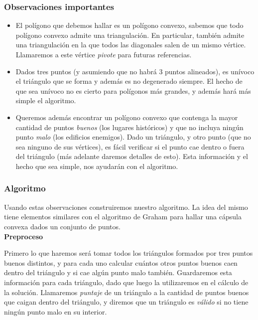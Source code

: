 \subsubsection{Observaciones importantes}
\begin{itemize}
\item El polígono que debemos hallar es un polígono convexo, sabemos que todo 
polígono convexo admite una triangulación. En particular, también admite una triangulación 
en la que todos las diagonales salen de un mismo vértice. Llamaremos a este vértice \textit{pivote} 
para futuras referencias. 
\item Dados tres puntos (y asumiendo que no habrá 3 puntos alineados), es unívoco el triángulo que se 
forma y además es no degenerado siempre. El hecho de que sea unívoco no es cierto para polígonos más 
grandes, y además hará más simple el algoritmo. 
\item Queremos además encontrar un polígono convexo que contenga la mayor cantidad de puntos \textit{buenos} 
(los lugares históricos) y que no incluya ningún punto \textit{malo} (los edificios enemigos). 
Dado un triángulo, y otro punto (que no sea ninguno de sus vértices), es fácil verificar si el punto 
cae dentro o fuera del triángulo (más adelante daremos detalles de esto). Esta información y el 
hecho que sea simple, nos ayudarán con el algoritmo. 
\end{itemize}

\subsubsection{Algoritmo}
Usando estas observaciones construiremos nuestro algoritmo. La idea del mismo tiene elementos similares 
con el algoritmo de Graham para hallar una cápsula convexa dados un conjunto de puntos. \\

\textbf{Preproceso}

Primero lo que haremos será tomar todos los triángulos formados por tres puntos buenos distintos, 
y para cada uno calcular cuántos otros puntos buenos caen dentro del triángulo y si cae algún punto malo 
también. Guardaremos esta información para cada triángulo, dado que luego la utilizaremos en 
el cálculo de la solución. Llamaremos \textit{puntaje} de un triángulo a la cantidad de puntos buenos 
que caigan dentro del triángulo, y diremos que un triángulo es \textit{válido} si no tiene 
ningún punto malo en su interior. 

